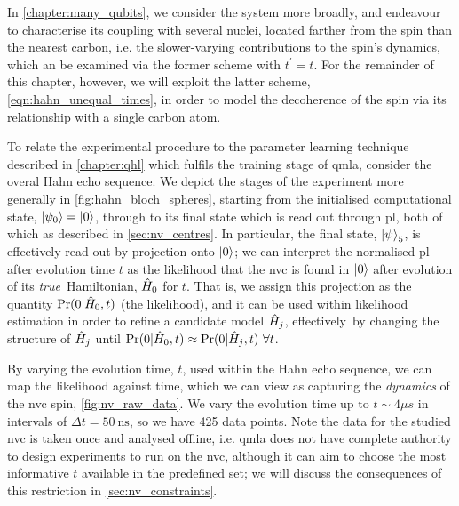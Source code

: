 In \cref{chapter:many_qubits}, we consider the system more broadly, and endeavour to 
    characterise its coupling with several nuclei, located farther from the spin than the nearest \gls{carbon},
    i.e. the slower-varying contributions to the spin's dynamics, 
    which an be examined via the former scheme with $t^{\prime} = t$. 
For the remainder of this chapter, however, we will exploit the latter scheme, \cref{eqn:hahn_unequal_times}, 
    in order to model the decoherence of the spin via its relationship with a single \gls{carbon} atom. 
\par 

To relate the experimental procedure to the parameter learning technique described in \cref{chapter:qhl}
    which fulfils the training stage of \gls{qmla}, consider the overal Hahn echo sequence.
We depict the stages of the experiment more generally in \cref{fig:hahn_bloch_spheres}, 
    starting from the initialised computational state, $\ket{\psi_0} = \ket{0}$,
    through to its final state which is read out through \gls{pl},
    both of which as described in \cref{sec:nv_centres}.
In particular, the final state, $\ket{\psi}_5$, is effectively read out by projection onto $\ket{0}$;
    we can interpret the normalised \gls{pl} after evolution time $t$ as the  \gls{likelihood} 
    that the \gls{nvc} is found in $\ket{0}$ after evolution of its \emph{true}\footnotemark \ Hamiltonian, $\hat{H}_0$ for $t$. 
That is, we assign this projection as the quantity $\Pr(0 | \hat{H}_0, t)$ (the  \gls{likelihood}), 
    and it can be used within \gls{likelihood} estimation in order to refine a candidate model $\hat{H}_j$, 
    effectively\footnotemark \ by changing the structure of 
    $\hat{H}_j$ until $\Pr(0 | \hat{H}_0, t) \approx \Pr(0 | \hat{H}_j, t) \ \forall t$. 

\par 

By varying the evolution time, $t$, used within the Hahn echo sequence, we can map the \gls{likelihood} against time, 
    which we can view as capturing the \emph{dynamics} of the \gls{nvc} spin, \cref{fig:nv_raw_data}.
We vary the evolution time up to $t \sim 4 \mu s$ in intervals of $\Delta t = 50 \SI{}{\nano\second}$, 
    so we have 425 data points. 
Note the data for the studied \gls{nvc} is taken once and analysed offline, 
    i.e. \gls{qmla} does not have complete authority to design \glspl{experiment} 
    to run on the \gls{nvc}, although it can aim to choose the most informative $t$ 
    available in the predefined set; we will discuss the consequences of this restriction 
    in \cref{sec:nv_constraints}. 

